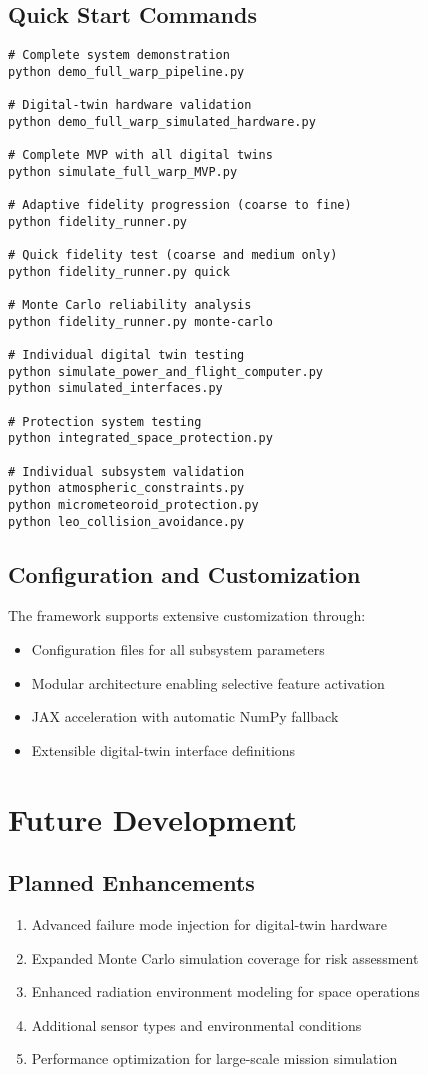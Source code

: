 \documentclass[11pt]{article}
\begin{document}
\subsection{Quick Start Commands}
\begin{verbatim}
# Complete system demonstration
python demo_full_warp_pipeline.py

# Digital-twin hardware validation
python demo_full_warp_simulated_hardware.py

# Complete MVP with all digital twins
python simulate_full_warp_MVP.py

# Adaptive fidelity progression (coarse to fine)
python fidelity_runner.py

# Quick fidelity test (coarse and medium only)
python fidelity_runner.py quick

# Monte Carlo reliability analysis
python fidelity_runner.py monte-carlo

# Individual digital twin testing
python simulate_power_and_flight_computer.py
python simulated_interfaces.py

# Protection system testing
python integrated_space_protection.py

# Individual subsystem validation
python atmospheric_constraints.py
python micrometeoroid_protection.py
python leo_collision_avoidance.py
\end{verbatim}

\subsection{Configuration and Customization}
The framework supports extensive customization through:
\begin{itemize}
\item Configuration files for all subsystem parameters
\item Modular architecture enabling selective feature activation
\item JAX acceleration with automatic NumPy fallback
\item Extensible digital-twin interface definitions
\end{itemize}

\section{Future Development}

\subsection{Planned Enhancements}
\begin{enumerate}
\item Advanced failure mode injection for digital-twin hardware
\item Expanded Monte Carlo simulation coverage for risk assessment
\item Enhanced radiation environment modeling for space operations
\item Additional sensor types and environmental conditions
\item Performance optimization for large-scale mission simulation
\end{enumerate}
\end{document}
